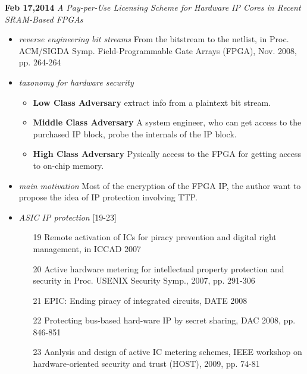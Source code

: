 \documentclass[]{article}
\begin{document}
\noindent \textbf{Feb 17,2014}
\textit{A Pay-per-Use Licensing Scheme for Hardware IP Cores in Recent
        SRAM-Based FPGAs}
\indent		\begin{itemize}
            \item \textit{reverse engineering bit streams} From the bitstream to
            the netlist, in Proc. ACM/SIGDA Symp. Field-Programmable Gate Arrays
            (FPGA), Nov. 2008, pp. 264-264
            \item \textit{taxonomy for hardware security}
                \begin{itemize}
                \item \textbf{Low Class Adversary} extract info from a plaintext
                bit stream.
                \item \textbf{Middle Class Adversary}
                A system engineer, who can get access to the purchased IP block,
                probe the internals of the IP block.
                \item \textbf{High Class Adversary}
                Pysically access to the FPGA for getting access to on-chip
                memory.
                \end{itemize}
            \item \textit{main motivation} Most of the encryption of the FPGA
            IP, the author want to propose the idea of IP protection involving
            TTP.
            \item \textit{ASIC IP protection} [19-23]
                \begin{itemize}
                \item [19] Remote activation of ICs for piracy prevention and
                digital right management, in ICCAD 2007
                \item [20] Active hardware metering for intellectual property
                protection and security in Proc. USENIX Security Symp., 2007,
                pp. 291-306
                \item [21] EPIC: Ending piracy of integrated circuits, DATE 2008
                \item [22] Protecting bus-based hard-ware IP by secret sharing,
                DAC 2008, pp. 846-851
                \item [23] Aanlysis and design of active IC metering schemes,
                IEEE workshop on hardware-oriented security and trust (HOST),
                2009, pp. 74-81
                \end{itemize}
        \end{itemize}
\end{document}
